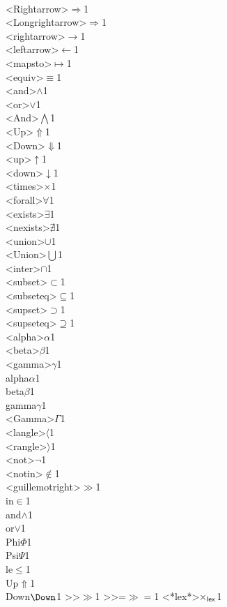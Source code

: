 {  {\\<Rightarrow>}{{$\Rightarrow$}}1
  {\\<Longrightarrow>}{{$\Longrightarrow$}}1
  {\\<rightarrow>}{{$\rightarrow$}}1
  {\\<leftarrow>}{{$\leftarrow$}}1
  {\\<mapsto>}{{$\mapsto$}}1
  {\\<equiv>}{{$\equiv$}}1
  {\\<and>}{{$\wedge$}}1
  {\\<or>}{{$\vee$}}1
  {\\<And>}{{$\bigwedge$}}1
  {\\<Up>}{{$\Uparrow$}}1
  {\\<Down>}{{$\Downarrow$}}1
  {\\<up>}{{$\uparrow$}}1
  {\\<down>}{{$\downarrow$}}1
  {\\<times>}{{$\times$}}1
  {\\<forall>}{{$\forall$}}1
  {\\<exists>}{{$\exists$}}1
  {\\<nexists>}{{$\nexists$}}1
  {\\<union>}{{$\cup$}}1
  {\\<Union>}{{$\bigcup$}}1
  {\\<inter>}{{$\cap$}}1
  {\\<subset>}{{$\subset$}}1
  {\\<subseteq>}{{$\subseteq$}}1
  {\\<supset>}{{$\supset$}}1
  {\\<supseteq>}{{$\supseteq$}}1
  {\\<alpha>}{{$\alpha$}}1
  {\\<beta>}{{$\beta$}}1
  {\\<gamma>}{{$\gamma$}}1
  {\\alpha}{{$\alpha$}}1
  {\\beta}{{$\beta$}}1
  {\\gamma}{{$\gamma$}}1
  {\\<Gamma>}{{$\Gamma$}}1
  {\\<langle>}{{$\langle$}}1
  {\\<rangle>}{{$\rangle$}}1
  {\\<not>}{{$\neg$}}1
  {\\<notin>}{{$\notin$}}1
  {\\<guillemotright>}{{$\gg$}}1
  {\\in}{$\in$}1
  {\\and}{$\wedge$}1
  {\\or}{$\vee$}1
  {\\Phi}{{$\Phi$}}1
  {\\Psi}{{$\Psi$}}1
  {\\le}{{$\le$}}1
  {\\Up}{{$\Uparrow$}}1
  {\\Down}{{$\Down$}}1
  {>>}{{$\gg$}}1
  {>>=}{{${\gg}{=}$}}1
  {<*lex*>}{{$\times_{\sf lex}$}}1
}

